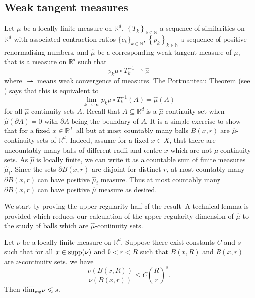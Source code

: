 \subsection{Weak tangent measures} \label{ch-upper-reg:weaktangentsproof}

Let $\mu$ be a locally finite measure on $\mathbb{R}^d$, $\left\{T_k\right\}_{k\in \mathbb{N}}$ a sequence of similarities on $\mathbb{R}^d$ with associated contraction ratios $\{c_k\}_{k\in \mathbb{N}}$, $\left\{p_k\right\}_{k\in \mathbb{N}}$ a sequence of positive renormalising numbers, and $\hat{\mu}$ be a corresponding weak tangent measure of $\mu$, that is a measure on $\mathbb{R}^d$ such that 
\[
p_k \mu \circ T^{-1}_k \rightharpoonup \hat{\mu}
\]
where $\rightharpoonup$ means weak convergence of measures. The Portmanteau Theorem (see \cite[Theorem 1.24]{mattila}) says that this is equivalent to 
\[
\lim_{k\rightarrow \infty} p_k \mu \circ T^{-1}_k (A) =\hat{\mu}(A)
\]
for all $\hat{\mu}$-continuity sets $A$. Recall that  $A\subseteq \mathbb{R}^d$ is a $\hat{\mu}$-continuity set when $\hat{\mu}(\partial A) = 0$ with $\partial A$ being the boundary of $A$. It is a simple exercise to show that for a fixed $x \in \mathbb{R}^d$, all but at most countably many balls $B(x,r)$ are $\hat{\mu}$-continuity sets of $\mathbb{R}^d$. Indeed, assume for a fixed $x \in X$, that there are uncountably many balls of different radii and centre $x$ which are not $\hat{\mu}$-continuity sets. As $\hat{\mu}$ is locally finite, we can write it as a countable sum of finite measures $\hat{\mu}_i$. Since the sets $\partial B(x,r)$ are disjoint for distinct $r$, at most countably many $\partial B(x,r)$ can have positive $\hat{\mu}_i$ measure. Thus at most countably many $\partial B(x,r)$ can have positive $\hat{\mu}$ measure as desired.


We start by proving the upper regularity half of the result. A technical lemma is provided which reduces our calculation of the upper regularity dimension of $\hat \mu$ to the study of balls which are $\hat{\mu}$-continuity sets.

\begin{lemma}\label{ch-upper-reg:nu-cont-upper-dim}
	Let $\nu$ be a locally finite measure  on $ \mathbb{R}^d$. Suppose there exist constants $C$ and $s$ such that for all $x\in \textup{supp}(\nu)$ and $0<r<R$ such that $B(x,R)$ and $B(x,r)$ are $\nu$-continuity sets, we have
	\[
	\frac{\nu(B(x,R))}{\nu(B(x,r))} \leq C\left(\frac{R}{r}\right)^{s}.
	\]
	Then $\overline{\dim}_{\textup{reg}}  \nu \le s.$
\end{lemma}

